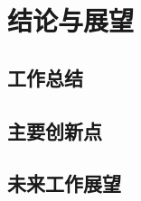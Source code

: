 \chapter{结论与展望}
\label{ch:conclusion}

\section{工作总结}
\label{sec:summary}

\section{主要创新点}
\label{sec:innovations}

\section{未来工作展望}
\label{sec:future-work}
